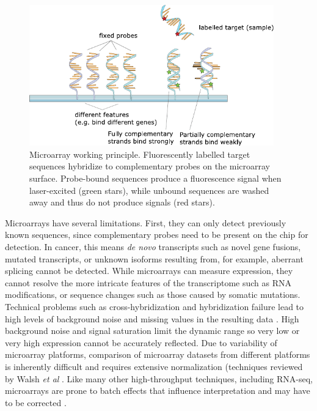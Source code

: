 \documentclass[11pt]{book}
\begin{document}
\begin{figure}[t]
\centering
\includegraphics[width=300pt]{img/microarray_hybridization.pdf}
\caption[Microarray Working Principle]{Microarray working principle. Fluorescently labelled target sequences hybridize to complementary probes on the microarray surface. Probe-bound sequences produce a fluorescence signal when laser-excited (green stars), while unbound sequences are washed away and thus do not produce signals (red stars).}
\label{fig:microarray}
\end{figure}

Microarrays have several limitations. First, they can only detect previously known sequences, since complementary probes need to be present on the chip for detection. In cancer, this means \textit{de novo} transcripts such as novel gene fusions, mutated transcripts, or unknown isoforms resulting from, for example, aberrant splicing cannot be detected. While microarrays can measure expression, they cannot resolve the more intricate features of the transcriptome such as RNA modifications, or sequence changes such as those caused by somatic mutations. Technical problems such as cross-hybridization and hybridization failure lead to high levels of background noise and missing values in the resulting data \cite{Wu:2005, Wei:2012}. High background noise and signal saturation limit the dynamic range so very low or very high expression cannot be accurately reflected. Due to variability of microarray platforms, comparison of microarray datasets from different platforms is inherently difficult and requires extensive normalization (techniques reviewed by Walsh \textit{et al} \cite{Walsh:2015}. Like many other high-throughput techniques, including RNA-seq, microarrays are prone to batch effects that influence interpretation and may have to be corrected \cite{Johnson:2007, Espin-Perez:2018}.
\end{document}
